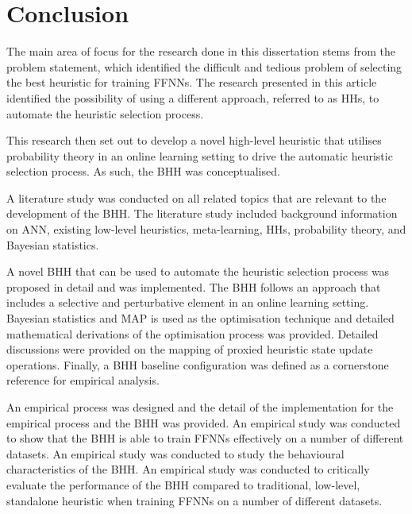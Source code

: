 \section{Conclusion}
\label{sec:conclusion}

The main area of focus for the research done in this dissertation stems from the problem statement, which identified the difficult and tedious problem of selecting the best heuristic for training \acp{FFNN}. The research presented in this article identified the possibility of using a different approach, referred to as \acp{HH}, to automate the heuristic selection process.

This research then set out to develop a novel high-level heuristic that utilises probability theory in an online learning setting to drive the automatic heuristic selection process. As such, the \acs{BHH} was conceptualised.

A literature study was conducted on all related topics that are relevant to the development of the \acs{BHH}. The literature study included background information on \acs{ANN}, existing low-level heuristics, meta-learning, \acp{HH}, probability theory, and Bayesian statistics.

A novel \acs{BHH} that can be used to automate the heuristic selection process was proposed in detail and was implemented. The \acs{BHH} follows an approach that includes a selective and perturbative element in an online learning setting. Bayesian statistics and \acs{MAP} is used as the optimisation technique and detailed mathematical derivations of the optimisation process was provided. Detailed discussions were provided on the mapping of proxied heuristic state update operations. Finally, a \acs{BHH} baseline configuration was defined as a cornerstone reference for empirical analysis.

An empirical process was designed and the detail of the implementation for the empirical process and the \acs{BHH} was provided. An empirical study was conducted to show that the \ac{BHH} is able to train \acp{FFNN} effectively on a number of different datasets. An empirical study was conducted to study the behavioural characteristics of the \acs{BHH}. An empirical study was conducted to critically evaluate the performance of the \acs{BHH} compared to traditional, low-level, standalone heuristic when training \acp{FFNN} on a number of different datasets.

